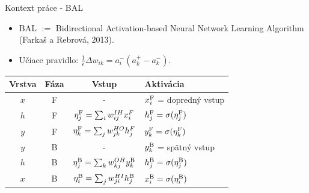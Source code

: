 \documentclass[xcolor=dvipsnames]{beamer}
\begin{document}
\begin{frame}{Kontext práce - BAL}
  \begin{itemize} 
    \item BAL $:=$ Bidirectional Activation-based Neural Network Learning Algorithm (Farkaš a Rebrová, 2013).
    \item Učiace pravidlo: $ \frac{1}{\epsilon}\Delta w_{ik} = a_{i}^{-}(a_{k}^{+} - a_{k}^{-}). $
  \end{itemize} 

  \begin{table}
    \centering
    \begin{tabular}{|cccl|}
      \hline
      Vrstva & Fáza & Vstup & Aktivácia\\
      \hline
      $x$ & F & - & $x^{\rm F}_i$ = dopredný vstup\\ [1ex]
      $h$ & F & \hspace{0.3cm}$\eta^{\rm F}_j = \sum_i w_{ij}^{IH}x^{F}_i$\hspace{0.3cm} & $h^{\rm F}_j = \sigma(\eta^{\rm F}_j)$\hspace{0.3cm}\\ [1ex]
      $y$ & F & $\eta^{\rm F}_k = \sum_j w_{jk}^{HO}h^{F}_j$ & $y^{\rm F}_k = \sigma(\eta^{\rm F}_k)$\\ [1ex]
      \hline
      $y$ & B & - & $y^{\rm B}_k$ = spätný vstup\\ [1ex]
      $h$ & B & $\eta^{\rm B}_j = \sum_k w_{kj}^{OH}y^{\rm B}_k$ & $h^{\rm B}_j = \sigma(\eta^{\rm B}_j)$\\ [1ex]
      $x$ & B  & $\eta^{\rm B}_i = \sum_j w_{ji}^{HI}h^{\rm B}_j$ & $x^{\rm B}_i = \sigma(\eta^{\rm B}_i)$\\
      \hline
    \end{tabular}
    \label{tab:bal-states}
  \end{table}
\end{frame}

\end{document}
